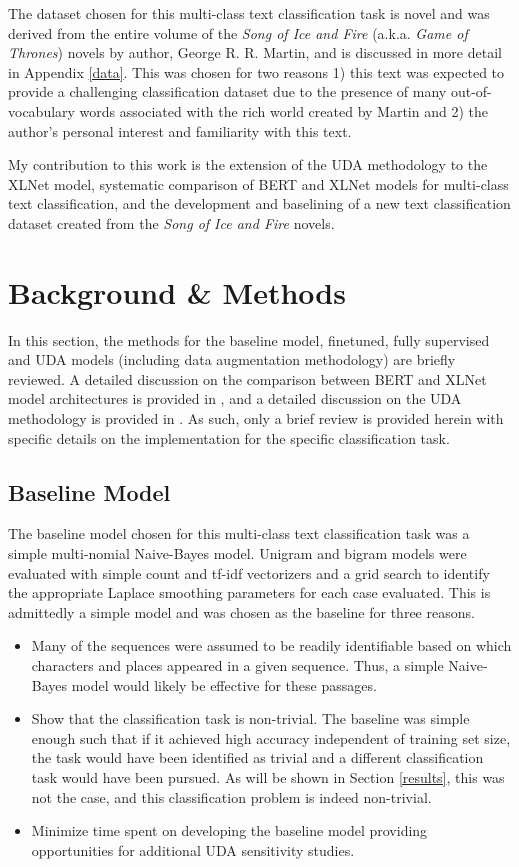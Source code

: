 \documentclass[twoside,twocolumn,10pt]{article}
\begin{document}
The dataset chosen for this multi-class text classification task is novel and was derived from the entire volume of the {\it Song of Ice and Fire} (a.k.a. {\it Game of Thrones}) novels by author, George R. R. Martin, and is discussed in more detail in Appendix \ref{data}. This was chosen for two reasons 1) this text was expected to provide a challenging classification dataset due to the presence of many out-of-vocabulary words associated with the rich world created by Martin and 2) the author's personal interest and familiarity with this text.

My contribution to this work is the extension of the UDA methodology to the XLNet model, systematic comparison of BERT and XLNet models for multi-class text classification, and the development and baselining of a new text classification dataset created from the \textit{Song of Ice and Fire} novels.

\section{Background \& Methods} \label{background}

In this section, the methods for the baseline model, finetuned, fully supervised and UDA models (including data augmentation methodology) are briefly reviewed. A detailed discussion on the comparison between BERT and XLNet model architectures is provided in \cite{Yang:2019}, and a detailed discussion on the UDA methodology is provided in \cite{Xie:2019}. As such, only a brief review is provided herein with specific details on the implementation for the specific classification task.

\subsection{Baseline Model}
The baseline model chosen for this multi-class text classification task was a simple multi-nomial Naive-Bayes model. Unigram and bigram models were evaluated with simple count and tf-idf vectorizers and a grid search to identify the appropriate Laplace smoothing parameters for each case evaluated. This is admittedly a simple model and was chosen as the baseline for three reasons.
\begin{itemize}
 	\item Many of the sequences were assumed to be readily identifiable based on which characters and places appeared in a given sequence. Thus, a simple Naive-Bayes model would likely be effective for these passages.
 	\item Show that the classification task is non-trivial. The baseline was simple enough such that if it achieved high accuracy independent of training set size, the task would have been identified as trivial and a different classification task would have been pursued. As will be shown in Section \ref{results}, this was not the case, and this classification problem is indeed non-trivial. 
 	\item Minimize time spent on developing the baseline model providing opportunities for additional UDA sensitivity studies.
 \end{itemize}
\end{document}
